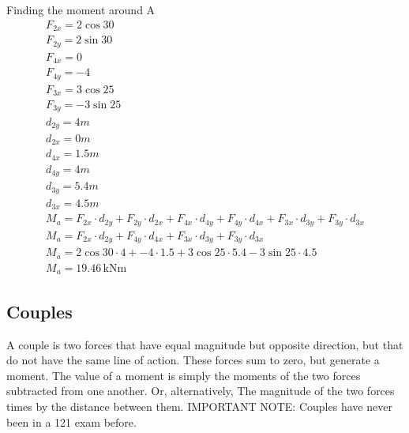 \documentclass[a4paper, 12pt]{article}
\newcommand{\unit}[1]{\ensuremath{\, \mathrm{#1}}}
\begin{document}
Finding the moment around A
\begin{gather*}
    F_{2x} = 2\cos{30} \\ 
    F_{2y} = 2\sin{30} \\
    F_{4x} = 0 \\ 
    F_{4y} = -4 \\
    F_{3x} = 3\cos{25} \\
    F_{3y} = -3\sin{25} \\
    d_{2y} = 4m \\
    d_{2x} = 0m \\
    d_{4x} = 1.5m \\
    d_{4y} = 4m \\
    d_{3y} = 5.4m \\
    d_{3x} = 4.5m \\
    M_a = F_{2x} \cdot d_{2y} + F_{2y} \cdot d_{2x} + F_{4x} \cdot d_{4y} + F_{4y} \cdot d_{4x} + F_{3x} \cdot d_{3y} + F_{3y} \cdot d_{3x} \\
    M_a = F_{2x} \cdot d_{2y} + F_{4y} \cdot d_{4x} + F_{3x} \cdot d_{3y} + F_{3y} \cdot d_{3x} \\
    M_a = 2\cos{30} \cdot 4 + -4 \cdot 1.5 + 3\cos{25} \cdot 5.4 - 3\sin{25} \cdot 4.5 \\ 
    M_a = 19.46 \unit{kNm}
\end{gather*}
\subsection{Couples}
A couple is two forces that have equal magnitude but opposite direction, but that do not have the same line of action.
These forces sum to zero, but generate a moment. The value of a moment is simply the moments of the two forces subtracted from one another.
Or, alternatively, The magnitude of the two forces times by the distance between them. IMPORTANT NOTE: Couples have never been in a 121 exam before.
\end{document}

